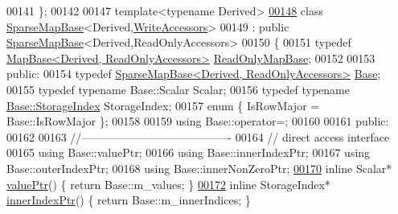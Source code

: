 \begin{DoxyCode}
00141 \};
00142 
00147 \textcolor{keyword}{template}<\textcolor{keyword}{typename} Derived>
\hyperlink{group___sparse_core___module}{00148} \textcolor{keyword}{class }\hyperlink{class_eigen_1_1_sparse_map_base}{SparseMapBase}<Derived,\hyperlink{group__enums_gga9f93eac38eb83deb0e8dbd42ddf11d5da2c59ef3697d65866c3a8e16eda7881ab}{WriteAccessors}>
00149   : \textcolor{keyword}{public} \hyperlink{class_eigen_1_1_sparse_map_base}{SparseMapBase}<Derived,ReadOnlyAccessors>
00150 \{
00151     \textcolor{keyword}{typedef} \hyperlink{group___core___module_class_eigen_1_1_map_base_3_01_derived_00_01_read_only_accessors_01_4}{MapBase<Derived, ReadOnlyAccessors>} 
      \hyperlink{group___core___module_class_eigen_1_1_map_base_3_01_derived_00_01_read_only_accessors_01_4}{ReadOnlyMapBase};
00152     
00153   \textcolor{keyword}{public}:
00154     \textcolor{keyword}{typedef} \hyperlink{group___sparse_core___module_class_eigen_1_1_sparse_map_base_3_01_derived_00_01_read_only_accessors_01_4}{SparseMapBase<Derived, ReadOnlyAccessors>} 
      \hyperlink{group___sparse_core___module_class_eigen_1_1_sparse_matrix_base}{Base};
00155     \textcolor{keyword}{typedef} \textcolor{keyword}{typename} Base::Scalar Scalar;
00156     \textcolor{keyword}{typedef} \textcolor{keyword}{typename} \hyperlink{group___sparse_core___module_a0b540ba724726ebe953f8c0df06081ed}{Base::StorageIndex} StorageIndex;
00157     \textcolor{keyword}{enum} \{ IsRowMajor = Base::IsRowMajor \};
00158     
00159     \textcolor{keyword}{using} Base::operator=;
00160 
00161   \textcolor{keyword}{public}:
00162     
00163     \textcolor{comment}{//----------------------------------------}
00164     \textcolor{comment}{// direct access interface}
00165     \textcolor{keyword}{using} Base::valuePtr;
00166     \textcolor{keyword}{using} Base::innerIndexPtr;
00167     \textcolor{keyword}{using} Base::outerIndexPtr;
00168     \textcolor{keyword}{using} Base::innerNonZeroPtr;
\hyperlink{group___sparse_core___module_af91648a18729ae8ff29cb1d8751c5655}{00170}     \textcolor{keyword}{inline} Scalar* \hyperlink{group___sparse_core___module_af91648a18729ae8ff29cb1d8751c5655}{valuePtr}()              \{ \textcolor{keywordflow}{return} Base::m\_values; \}
\hyperlink{group___sparse_core___module_af5cd1f13dde8578eb9891a4ac4a11977}{00172}     \textcolor{keyword}{inline} StorageIndex* \hyperlink{group___sparse_core___module_af5cd1f13dde8578eb9891a4ac4a11977}{innerIndexPtr}()   \{ \textcolor{keywordflow}{return} Base::m\_innerIndices; \}

\end{DoxyCode}
